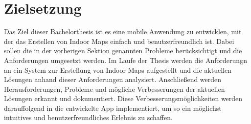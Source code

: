 \section{Zielsetzung}
Das Ziel dieser Bachelorthesis ist es eine mobile Anwendung zu entwicklen, mit der das Erstellen von Indoor Maps einfach und benutzerfreundlich ist.
Dabei sollen die in der vorherigen Sektion genannten Probleme berücksichtigt und die Anforderungen umgesetzt werden.
Im Laufe der Thesis werden die Anforderungn an ein System zur Erstellung von Indoor Maps aufgestellt und die aktuellen Lösungen anhand dieser Anforderungen analysiert.
Anschließend werden Herausforderungen, Probleme und mögliche Verbesserungen der aktuellen Lösungen erkannt und dokumentiert.
Diese Verbesserungsmöglichkeiten werden darauffolgend in die entwickelte App implementiert, um so ein möglichst intuitives und benutzerfreundliches Erlebnis zu schaffen.
